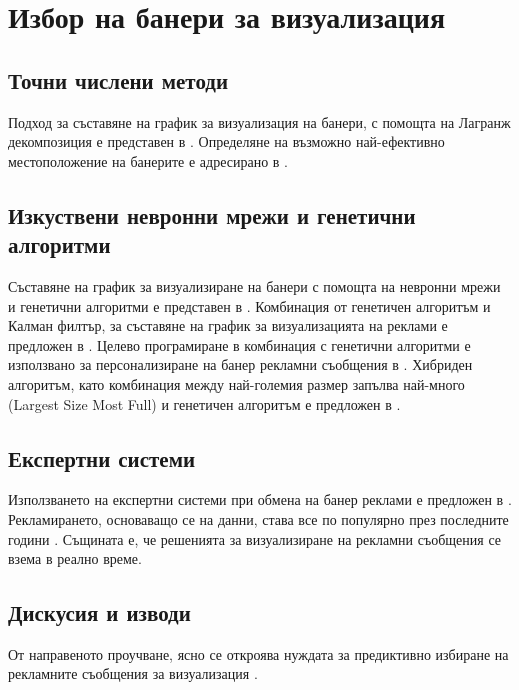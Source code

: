 \chapter{Избор на банери за визуализация}

\section{Точни числени методи}

Подход за съставяне на график за визуализация на банери, с помощта на Лагранж декомпозиция е представен в \cite{10.1145/945846.945848}. Определяне на възможно най-ефективно местоположение на банерите е адресирано в \cite{Kaul2018}.

\section{Изкуствени невронни мрежи и генетични алгоритми}

Съставяне на график за визуализиране на банери с помощта на невронни мрежи и генетични алгоритми е представен в \cite{DEANE20125168}. Комбинация от генетичен алгоритъм и Калман филтър, за съставяне на график за визуализацията на реклами е предложен в \cite{doi:10.1287/mksc.17.3.214}. Целево програмиране в комбинация с генетични алгоритми е използвано за персонализиране на банер рекламни съобщения в \cite{KARUGA200185}. Хибриден алгоритъм, като комбинация между най-големия размер запълва най-много (Largest Size Most Full) и генетичен алгоритъм е предложен в \cite{KUMAR20061067}.

\section{Експертни системи}

Използването на експертни системи при обмена на банер реклами е предложен в \cite{Krasteleva_Soshnikov_2002}. Рекламирането, основаващо се на данни, става все по популярно през последните години \cite{Stange2014}. Същината е, че решенията за визуализиране на рекламни съобщения се взема в реално време.

\section{Дискусия и изводи}

От направеното проучване, ясно се откроява нуждата за предиктивно избиране на рекламните съобщения за визуализация \cite{doi:10.1089/big.2015.0006}. 

